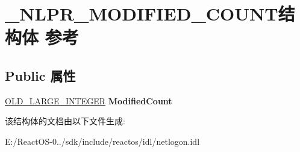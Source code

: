 \hypertarget{struct___n_l_p_r___m_o_d_i_f_i_e_d___c_o_u_n_t}{}\section{\+\_\+\+N\+L\+P\+R\+\_\+\+M\+O\+D\+I\+F\+I\+E\+D\+\_\+\+C\+O\+U\+N\+T结构体 参考}
\label{struct___n_l_p_r___m_o_d_i_f_i_e_d___c_o_u_n_t}
\subsection*{Public 属性}
\begin{DoxyCompactItemize}
\item 
\mbox{\label{struct___n_l_p_r___m_o_d_i_f_i_e_d___c_o_u_n_t_a47ad6240dd67262eb7d86dc76c8bb2f0}} 
\hyperlink{struct___o_l_d___l_a_r_g_e___i_n_t_e_g_e_r}{O\+L\+D\+\_\+\+L\+A\+R\+G\+E\+\_\+\+I\+N\+T\+E\+G\+ER} {\bfseries Modified\+Count}
\end{DoxyCompactItemize}


该结构体的文档由以下文件生成\+:\begin{DoxyCompactItemize}
\item 
E\+:/\+React\+O\+S-\/0../sdk/include/reactos/idl/netlogon.\+idl\end{DoxyCompactItemize}
